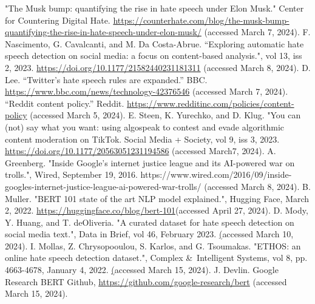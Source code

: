 \documentclass[conference]{IEEEtran}
\begin{document}
\begin{thebibliography}{00}

"The Musk bump: quantifying the rise in hate speech under Elon Musk." Center for Countering Digital Hate. \href{https://counterhate.com/blog/the-musk-bump-quantifying-the-rise-in-hate-speech-under-elon-musk}{https://counterhate.com/blog/the-musk-bump-quantifying-the-rise-in-hate-speech-under-elon-musk/} (accessed March 7, 2024).
F. Nascimento, G. Cavalcanti, and M. Da Costa-Abrue. “Exploring automatic hate speech detection on social media: a focus on content-based analysis.", vol 13, iss 2, 2023. \href{https://doi.org/10.1177/21582440231181311}{https://doi.org/10.1177/21582440231181311} (accessed March 8, 2024).
D. Lee. “Twitter's hate speech rules are expanded.” BBC. \href{https://www.bbc.com/news/technology-42376546}{https://www.bbc.com/news/technology-42376546} (accessed March 7, 2024).
 “Reddit content policy.” Reddit. \href{https://www.redditinc.com/policies/content-policy}{https://www.redditinc.com/policies/content-policy} (accessed March 5, 2024).
E. Steen, K. Yurechko, and D. Klug. "You can (not) say what you want: using algospeak to contest and evade algorithmic content moderation on TikTok. Social Media + Society, vol 9, iss 3, 2023. \href{https://doi.org/10.1177/20563051231194586}{https://doi.org/10.1177/20563051231194586} (accessed March7, 2024).
A. Greenberg. "Inside Google’s internet justice league and its AI-powered war on trolls.", Wired, September 19, 2016. https://www.wired.com/2016/09/inside-googles-internet-justice-league-ai-powered-war-trolls/ (accessed March 8, 2024).
 B. Muller. "BERT 101 state of the art NLP model explained.", Hugging Face, March 2, 2022. \href{https://huggingface.co/blog/bert-101}{https://huggingface.co/blog/bert-101}(accessed April 27, 2024).
 D. Mody, Y. Huang, and T. deOliveria. "A curated dataset for hate speech detection on social media text.", Data in Brief, vol 46, February 2023. \href{https://www.sciencedirect.com/science/article/pii/S2352340922010356?via%3Dihub} (accessed March 10, 2024).
 I. Mollas, Z. Chrysopooulou, S. Karlos, and G. Tsoumakas. "ETHOS: an online hate speech detection dataset.", Complex \&\ Intelligent Systems, vol 8, pp. 4663-4678, January 4, 2022. \href{https://arxiv.org/pdf/2006.08328.pdf} (accessed March 15, 2024).
J. Devlin. Google Research BERT Github, \href{https://github.com/google-research/bert}{https://github.com/google-research/bert} (accessed March 15, 2024).

\end{thebibliography}
\end{document}
